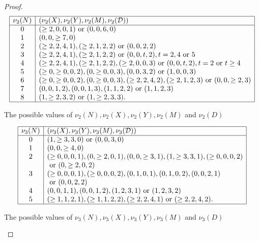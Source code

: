 \documentclass[11pt]{report}
\theoremstyle{definition}
\begin{document}
\begin{proof}
\begin{table}[h]
$$
\begin{array}{|c|l|} \hline
\nu_2 (N) & (\nu_2 (X), \nu_2 (Y), \nu_2 (M), \nu_2 (\mathcal{D}) ) \\ \hline
0 &  (\geq 2, 0, 0, 1)  \mbox{ or } (0,0,6, 0)  \\
1 & (0,0,\geq 7, 0)  \\
2 & (\geq 2, 2, 4, 1), (\geq 2, 1, 2, 2) \mbox{ or } (0,0,2, 2) \\
3 & (\geq 2, 2, 4, 1), (\geq 2, 1, 2, 2)  \mbox{ or }  (0,0,t, 2), t= 2, 4 \mbox{ or } 5  \\
4 &  (\geq 2, 2, 4, 1), (\geq 2, 1, 2, 2), (\geq 2, 0, 0, 3)  \mbox{ or }  (0,0,t, 2), t= 2 \mbox{ or } t \geq 4  \\
5 & (\geq 0, \geq 0, 0, 2), (0, \geq 0, 0, 3), (0,0,3, 2) \mbox{ or } (1,0,0, 3)  \\
6 & (\geq 0, \geq 0, 0, 2), (0, \geq 0, 0, 3), (\geq 2, 2, 4, 2), (\geq 2, 1, 2, 3) \mbox{ or }  (0,0,\geq 2, 3) \\
7 & (0,0,1,2), (0,0,1,3), (1,1,2,2) \mbox{ or } (1,1,2,3) \\
8 & (1, \geq 2, 3, 2) \mbox{ or } (1, \geq 2, 3, 3). \\
 \hline
\end{array}
$$
\caption{The possible values of $\nu_2(N), \nu_2 (X), \nu_2 (Y), \nu_2(M)$ and $\nu_2 (D)$}
\label{tab nu2 nxym}
\end{table}

\begin{table}[h]
$$
\begin{array}{|c|l|} \hline
\nu_3 (N) & (\nu_3 (X), \nu_3 (Y), \nu_3 (M), \nu_3 (\mathcal{D}) ) \\ \hline
0 & (1, \geq 3, 3, 0)  \mbox{ or } (0,0,3, 0)  \\
1 & (0,0,\geq 4, 0)  \\
2 & (\geq 0, 0, 0, 1), (0, \geq 2, 0, 1), (0,0, \geq 3, 1), (1, \geq 3, 3, 1), (\geq 0,0,0,2)  \\
 & \mbox{ or } (0,\geq 2, 0, 2) \\
3 & (\geq 0, 0, 0, 1),  (\geq 0, 0, 0, 2), (0,1,0, 1), (0,1,0, 2), (0,0,2,1)\\
 &  \mbox{ or } (0,0,2, 2) \\
4 &  (0,0,1,1), (0,0,1,2), (1,2,3,1) \mbox{ or } (1, 2, 3, 2) \\
5 &   (\geq 1, 1, 2, 1), (\geq 1, 1, 2, 2), (\geq 2, 2, 4, 1) \mbox{ or }  (\geq 2, 2, 4,2). \\
 \hline
\end{array}
$$
\caption{The possible values of $\nu_3(N), \nu_3(X), \nu_3 (Y), \nu_3(M)$ and $\nu_3 (D)$}
\label{tab nu3 nxym}
\end{table}


\end{proof}
\end{document}
